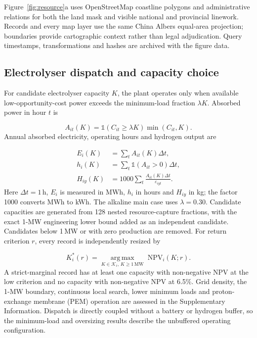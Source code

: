 \documentclass[lineno,pdflatex,sn-nature]{sn-jnl}
\begin{document}
Figure~\ref{fig:resource}a uses OpenStreetMap coastline polygons and administrative relations for both the land mask and visible national and provincial linework\cite{osmcoast}. Records and every map layer use the same China Albers equal-area projection; boundaries provide cartographic context rather than legal adjudication. Query timestamps, transformations and hashes are archived with the figure data.

\subsection*{Electrolyser dispatch and capacity choice}

For candidate electrolyser capacity $K$, the plant operates only when available low-opportunity-cost power exceeds the minimum-load fraction $\lambda K$. Absorbed power in hour $t$ is

\begin{equation}
A_{it}(K)=\mathbb{1}\!\left(C_{it}\geq\lambda K\right)\min(C_{it},K).
\label{eq:dispatch}
\end{equation}
Annual absorbed electricity, operating hours and hydrogen output are

\begin{equation}
\begin{aligned}
E_i(K)&=\sum_t A_{it}(K)\Delta t,\\
h_i(K)&=\sum_t\mathbb{1}\!\left(A_{it}>0\right)\Delta t,\\
H_{iy}(K)&=1000\sum_t\frac{A_{it}(K)\Delta t}{\varepsilon_{iyt}}.
\end{aligned}
\label{eq:operation}
\end{equation}
Here $\Delta t=1$\,h, $E_i$ is measured in MWh, $h_i$ in hours and $H_{iy}$ in kg; the factor 1000 converts MWh to kWh. The alkaline main case uses $\lambda=0.30$. Candidate capacities are generated from 128 nested resource-capture fractions, with the exact 1-MW engineering lower bound added as an independent candidate. Candidates below 1\,MW or with zero production are removed. For return criterion $r$, every record is independently resized by

\begin{equation}
K_i^*(r)=\underset{K\in\mathcal{K}_i,\,K\geq1\,\mathrm{MW}}{\operatorname{arg\,max}}
\;\mathrm{NPV}_i(K;r).
\label{eq:capacity}
\end{equation}
A strict-marginal record has at least one capacity with non-negative NPV at the low criterion and no capacity with non-negative NPV at 6.5\%. Grid density, the 1-MW boundary, continuous local search, lower minimum loads and proton-exchange membrane (PEM) operation are assessed in the Supplementary Information. Dispatch is directly coupled without a battery or hydrogen buffer, so the minimum-load and oversizing results describe the unbuffered operating configuration.
\end{document}
